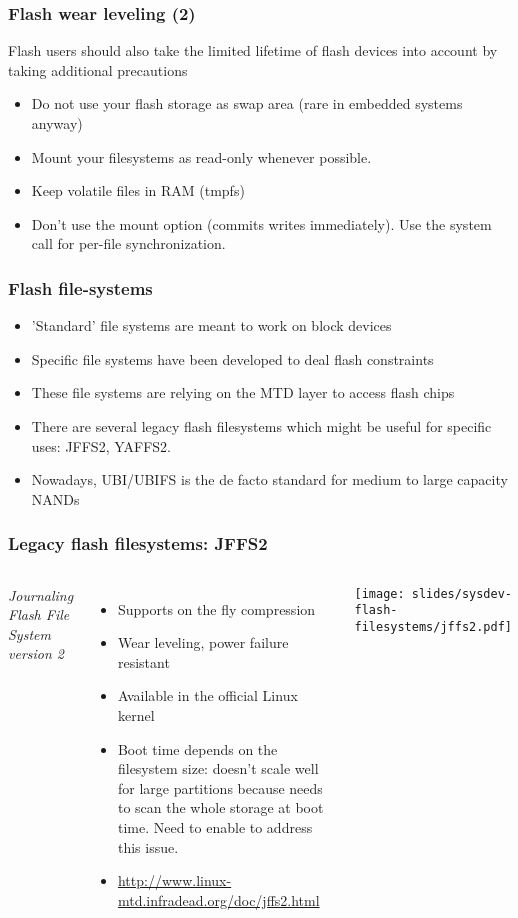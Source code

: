 \begin{frame}
  \frametitle{Flash wear leveling (2)}
  Flash users should also take the limited lifetime of flash
  devices into account by taking additional precautions
  \begin{itemize}
  \item Do not use your flash storage as swap area (rare in embedded
    systems anyway)
  \item Mount your filesystems as read-only whenever possible.
  \item Keep volatile files in RAM (tmpfs)
  \item Don't use the  mount option (commits writes
    immediately). Use the  system call for per-file
    synchronization.
  \end{itemize}
\end{frame}

\begin{frame}
  \frametitle{Flash file-systems}
  \begin{itemize}
  \item 'Standard' file systems are meant to work on block devices
  \item Specific file systems have been developed to deal flash
    constraints
  \item These file systems are relying on the MTD layer to access
    flash chips
  \item There are several legacy flash filesystems which might be
    useful for specific uses: JFFS2, YAFFS2.
  \item Nowadays, UBI/UBIFS is the de facto standard for medium to
    large capacity NANDs
  \end{itemize}
\end{frame}

\begin{frame}
  \frametitle{Legacy flash filesystems: JFFS2}
  \begin{columns}
    {\em Journaling Flash File System version 2}
    \begin{itemize}
    \item Supports on the fly compression
    \item Wear leveling, power failure resistant
    \item Available in the official Linux kernel
    \item Boot time depends on the filesystem size: doesn't scale well
      for large partitions because needs to scan the whole storage at
      boot time. Need to enable  to
      address this issue.
    \item \url{http://www.linux-mtd.infradead.org/doc/jffs2.html}
    \end{itemize}
    \texttt{[image: slides/sysdev-flash-filesystems/jffs2.pdf]}
  \end{columns}
\end{frame}

